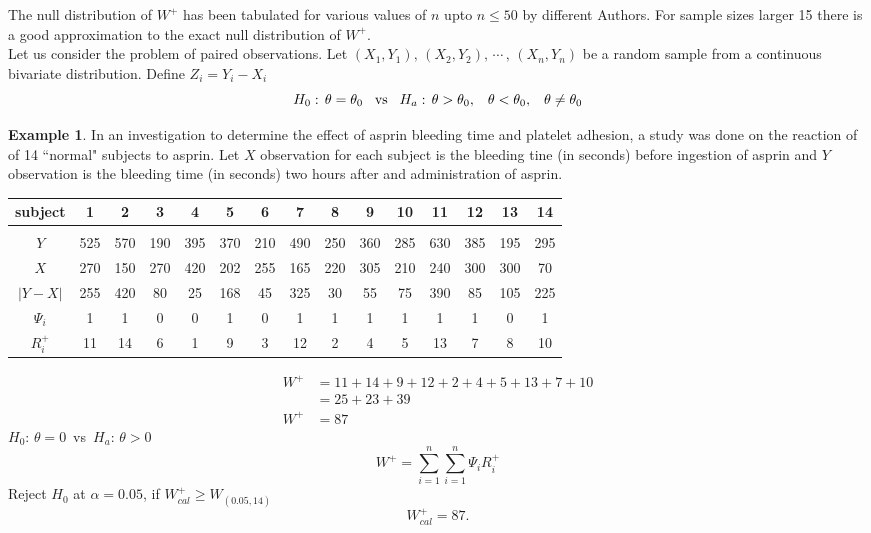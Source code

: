 \documentclass[12pt,a4paper]{report}
\theoremstyle{definition}
\newtheorem{exa}[thm]{Example}
\theoremstyle{plain}
\begin{document}
The null distribution of $W^+$ has been tabulated for various values of $n$ upto $n\leq 50$ by different Authors. For sample sizes larger 15 there is a good approximation to the exact null distribution of $W^+$.\\

Let us consider the problem of paired observations. Let $(X_1,Y_1),\, (X_2,Y_2), \, \cdots \, , \, (X_n,Y_n)$ be a random sample from a continuous bivariate distribution.
Define $Z_i = Y_i - X_i$ $$H_0:\, \theta = \theta_0\hspace{0.3cm}\text{vs}\hspace{0.3cm} H_a:\, \theta > \theta_0, \hspace{0.3cm} \theta < \theta_0, \hspace{0.3cm} \theta \neq \theta_0$$

\begin{exa}
In an investigation to determine the effect of asprin  bleeding time and platelet adhesion, a study was done on the  reaction of of  14 ``normal" subjects to asprin. Let $X$ observation for each subject is the bleeding tine (in seconds) before ingestion of asprin and $Y$ observation is the bleeding time (in seconds) two hours after and administration of asprin.
\end{exa}

\begin{table}[H]
\centering
\begin{tabular}{c|cccccccccccccc}
subject & 1 & 2 & 3 & 4 & 5 & 6 & 7 & 8 & 9 & 10 & 11 & 12 & 13 & 14\\
\hline
&&&&&&&&&&&&&&\\
$Y$ & 525 & 570 & 190 & 395 & 370 & 210 & 490 & 250 & 360 & 285 & 630 & 385 & 195 & 295\\
$X$ & 270 & 150 & 270 & 420 & 202 & 255 & 165 & 220 & 305 & 210 & 240 & 300 & 300 & 70\\
$|Y - X|$ & 255 & 420 & 80 & 25 & 168 & 45 & 325 & 30 & 55 & 75 & 390 & 85 & 105 & 225\\
\hline
$\Psi_i$ & 1 & 1 & 0 &  0 & 1 & 0 & 1 & 1 & 1 & 1 & 1 & 1  & 0 & 1\\
$R^+_i$ & 11 & 14 & 6 & 1 & 9 & 3 & 12 & 2 & 4 & 5 & 13 & 7 & 8 & 10\\
\hline
\end{tabular}
\end{table}


\begin{align*}
W^+  & = 11 + 14 + 9 + 12 + 2 + 4 + 5 + 13 + 7 + 10\\
& =25 + 23 + 39\\
W^+ & = 87
\end{align*}
$H_0:\, \theta = 0\,$ vs $\, H_a:\, \theta > 0$
$$W^+ = \sum^n_{i=1} \sum^n_{i=1} \Psi_iR^+_i$$
Reject $H_0$ at $\alpha = 0.05$, if $W^+_{cal} \geq W_{(0.05, 14)}$
$$W^+_{cal} =87.$$
\end{document}
